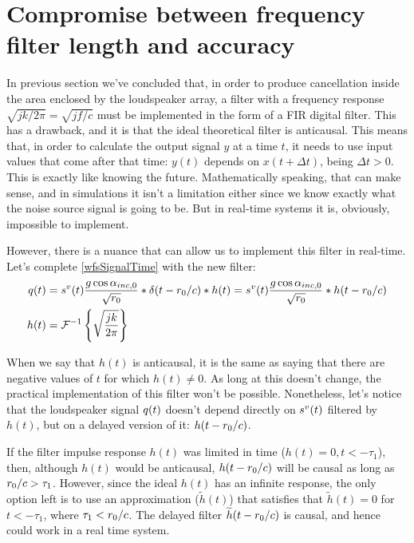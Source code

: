\section{Compromise between frequency filter length and accuracy}

In previous section we've concluded that, in order to produce cancellation inside the area enclosed by the loudspeaker array, a filter with a frequency response $\sqrt{jk/2\pi} = \sqrt{jf/c}$ must be implemented in the form of a FIR digital filter. This has a drawback, and it is that the ideal theoretical filter is anticausal. This means that, in order to calculate the output signal $y$ at a time $t$, it needs to use input values that come after that time: $y(t)$ depends on $x(t+\Delta t)$, being $\Delta t > 0$. This is exactly like knowing the future. Mathematically speaking, that can make sense, and in simulations it isn't a limitation either since we know exactly what the noise source signal is going to be.
But in real-time systems it is, obviously, impossible to implement.

However, there is a nuance that can allow us to implement this filter in real-time. Let's complete \autoref{wfsSignalTime} with the new filter:
\begin{equation}
\begin{aligned}
\signal[wfs][time](t) &= \signal[nsVirt][time](t) \frac{g \cos\normPrimaryPropAngleSection}{\sqrt{\distLinePrimSource}}
\ast\delta(t - \distLinePrimSource/c)\ast h(t) = \signal[nsVirt][time](t) \frac{g \cos\normPrimaryPropAngleSection}{\sqrt{\distLinePrimSource}}
\ast h(t - \distLinePrimSource/c)\\
h(t) &= \FourierTransform{\sqrt{\frac{jk}{2\pi}}}[inverse]
\end{aligned}
\end{equation}

When we say that $h(t)$ is anticausal, it is the same as saying that there are negative values of $t$ for which $h(t) \neq 0$. As long at this doesn't change, the practical implementation of this filter won't be possible. Nonetheless, let's notice that the loudspeaker signal $\signal[wfs][time](t)$ doesn't depend directly on $\signal[nsVirt][time](t)$ filtered by $h(t)$, but on a delayed version of it: $h(t - r_0/c)$.

If the filter impulse response $h(t)$ was limited in time ($h(t) = 0, t < -\tau_1$), then, although $h(t)$ would be anticausal, $h(t - r_0/c)$ will be causal as long as $r_0/c > \tau_1$. However, since the ideal $h(t)$ has an infinite response, the only option left is to use an approximation ($\widetilde{h}(t)$) that satisfies that $\widetilde{h}(t) = 0$ for $t < -\tau_1$, where $\tau_1 < r_0/c$. The delayed filter $\widetilde{h}(t - r_0/c)$ is causal, and hence could work in a real time system.

